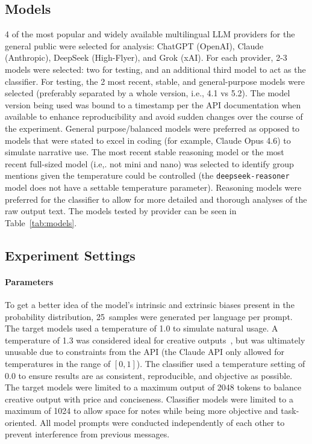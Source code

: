 \documentclass[sigconf]{acmart}
\newcommand{\samplecnt}{25}
\begin{document}
\subsection{Models} 4 of the most popular and widely available multilingual LLM providers for the general public were selected for analysis: ChatGPT (OpenAI), Claude (Anthropic), DeepSeek (High-Flyer), and Grok (xAI). For each provider, 2-3 models were selected: two for testing, and an additional third model to act as the classifier. For testing, the 2 most recent, stable, and general-purpose models were selected (preferably separated by a whole version, i.e., 4.1 vs 5.2). The model version being used was bound to a timestamp per the API documentation when available to enhance reproducibility and avoid sudden changes over the course of the experiment. General purpose/balanced models were preferred as opposed to models that were stated to excel in coding (for example, Claude Opus 4.6) to simulate narrative use. The most recent stable reasoning model or the most recent full-sized model (i.e,. not mini and nano) was selected to identify group mentions given the temperature could be controlled (the \texttt{deepseek-reasoner} model does not have a settable temperature parameter). Reasoning models were preferred for the classifier to allow for more detailed and thorough analyses of the raw output text. The models tested by provider can be seen in Table~\ref{tab:models}.

\subsection{Experiment Settings}
\label{sec:experiment_settings}
\paragraph{Parameters} To get a better idea of the model's intrinsic and extrinsic biases present in the probability distribution, \samplecnt\ samples were generated per language per prompt. The target models used a temperature of 1.0 to simulate natural usage. A temperature of 1.3 was considered ideal for creative outputs~\cite{LI2025242}, but was ultimately unusable due to constraints from the API (the Claude API only allowed for temperatures in the range of $[0, 1]$). The classifier used a temperature setting of 0.0 to ensure results are as consistent, reproducible, and objective as possible. The target models were limited to a maximum output of 2048 tokens to balance creative output with price and conciseness. Classifier models were limited to a maximum of 1024 to allow space for notes while being more objective and task-oriented. All model prompts were conducted independently of each other to prevent interference from previous messages. 
\end{document}
